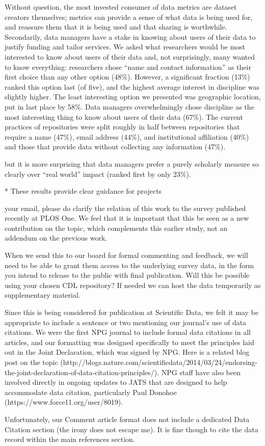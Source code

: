 
Without question, the most invested consumer of data metrics are dataset creators themselves; metrics can provide a sense of what data is being used for, and reassure them that it is being used and that sharing is worthwhile.
Secondarily, data managers have a stake in knowing about users of their data to justify funding and tailor services.
We asked what researchers would be most interested to know about users of their data and, not surprisingly, many wanted to know everything: researchers chose ``name and contact information'' as their first choice than any other option (48\%).
However, a significant fraction (13\%) ranked this option last (of five), and the highest average interest in discipline was slightly higher.
The least interesting option we presented was geographic location, put in last place by 58\%.
Data managers overwhelmingly chose discipline as the most interesting thing to know about users of their data (67\%).
The current practices of repositories were split roughly in half between repositories that require a name (47\%), email address (44\%), and institutional affiliation (40\%) and those that provide data without collecting any information (47\%).


but it is more surprising that data managers prefer a purely scholarly measure so clearly over ``real world'' impact (ranked first by only 23\%). 


* These results provide clear guidance for projects

your email, please do clarify the relation of this work to the survey published recently at PLOS One.  We feel that it is important that this be seen as a new contribution on the topic, which complements this earlier study, not an addendum on the previous work.  

When we send this to our board for formal commenting and feedback, we will need to be able to grant them access to the underlying survey data, in the form you intend to release to the public with final publication.  Will this be possible using your chosen CDL repository?  If needed we can host the data temporarily as supplementary material.

Since this is being considered for publication at Scientific Data, we felt it may be appropriate to include a sentence or two mentioning our journal's use of data citations.  We were the first NPG journal to include formal data citations in all articles, and our formatting was designed specifically to meet the principles laid out in the Joint Declaration, which was signed by NPG. Here is a related blog post on the topic (http://blogs.nature.com/scientificdata/2014/03/24/endorsing-the-joint-declaration-of-data-citation-principles/). NPG staff have also been involved directly in ongoing updates to JATS that are designed to help accommodate data citation, particularly Paul Donohoe (https://www.force11.org/user/8019).  

Unfortunately, our Comment article format does not include a dedicated Data Citation section (the irony does not escape me).  It is fine though to cite the data record within the main references section.  

